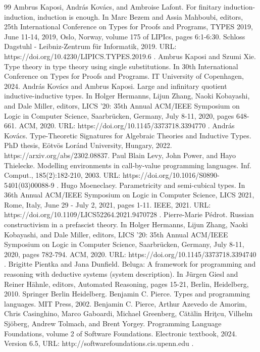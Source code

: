 \documentclass[10pt,a4paper]{amsart}
\begin{document}
\begin{thebibliography}{99}
 Ambrus Kaposi, András Kovács, and Ambroise Lafont. For finitary induction-induction, induction is enough. In Marc Bezem and Assia Mahboubi, editors, 25th International Conference on Types for Proofs and Programs, TYPES 2019, June 11-14, 2019, Oslo, Norway, volume 175 of LIPIcs, pages 6:1-6:30. Schloss Dagstuhl - Leibniz-Zentrum für Informatik, 2019. URL: https://doi.org/10.4230/LIPICS.TYPES.2019.6 .
 Ambrus Kaposi and Szumi Xie. Type theory in type theory using single substitutions. In 30th International Conference on Types for Proofs and Programs. IT University of Copenhagen, 2024.
 András Kovács and Ambrus Kaposi. Large and infinitary quotient inductive-inductive types. In Holger Hermanns, Lijun Zhang, Naoki Kobayashi, and Dale Miller, editors, LICS '20: 35th Annual ACM/IEEE Symposium on Logic in Computer Science, Saarbrücken, Germany, July 8-11, 2020, pages 648-661. ACM, 2020. URL: https://doi.org/10.1145/3373718.3394770 .
 András Kovács. Type-Theoretic Signatures for Algebraic Theories and Inductive Types. PhD thesis, Eötvös Loránd University, Hungary, 2022. https://arxiv.org/abs/2302.08837.
 Paul Blain Levy, John Power, and Hayo Thielecke. Modelling environments in call-by-value programming languages. Inf. Comput., 185(2):182-210, 2003. URL: https://doi.org/10.1016/S0890-5401(03)00088-9 .
 Hugo Moeneclaey. Parametricity and semi-cubical types. In 36th Annual ACM/IEEE Symposium on Logic in Computer Science, LICS 2021, Rome, Italy, June 29 - July 2, 2021, pages 1-11. IEEE, 2021. URL: https://doi.org/10.1109/LICS52264.2021.9470728 .
 Pierre-Marie Pédrot. Russian constructivism in a prefascist theory. In Holger Hermanns, Lijun Zhang, Naoki Kobayashi, and Dale Miller, editors, LICS '20: 35th Annual ACM/IEEE Symposium on Logic in Computer Science, Saarbrücken, Germany, July 8-11, 2020, pages 782-794. ACM, 2020. URL: https://doi.org/10.1145/3373718.3394740 .
 Brigitte Pientka and Jana Dunfield. Beluga: A framework for programming and reasoning with deductive systems (system description). In Jürgen Giesl and Reiner Hähnle, editors, Automated Reasoning, pages 15-21, Berlin, Heidelberg, 2010. Springer Berlin Heidelberg.
 Benjamin C. Pierce. Types and programming languages. MIT Press, 2002.
 Benjamin C. Pierce, Arthur Azevedo de Amorim, Chris Casinghino, Marco Gaboardi, Michael Greenberg, Cătălin Hriţcu, Vilhelm Sjöberg, Andrew Tolmach, and Brent Yorgey. Programming Language Foundations, volume 2 of Software Foundations. Electronic textbook, 2024. Version 6.5, URL: http://softwarefoundations.cis.upenn.edu .

\end{thebibliography}
\end{document}

